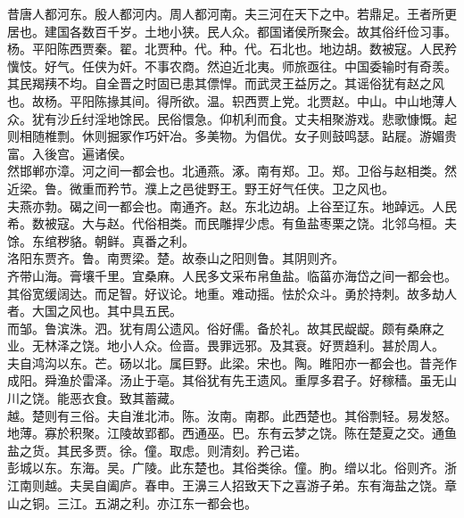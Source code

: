 \documentclass{zhvt-classic}
\begin{document}
\hspace*{2em}昔唐人都河东。殷人都河内。周人都河南。夫三河在天下之中。若鼎足。王者所更居也。建国各数百千岁。土地小狭。民人众。都国诸侯所聚会。故其俗纤俭习事。杨。平阳陈西贾秦。翟。北贾种。代。种。代。石北也。地边胡。数被寇。人民矜懻忮。好气。任侠为奸。不事农商。然迫近北夷。师旅亟往。中国委输时有奇羡。其民羯羠不均。自全晋之时固已患其僄悍。而武灵王益厉之。其谣俗犹有赵之风也。故杨。平阳陈掾其间。得所欲。温。轵西贾上党。北贾赵。中山。中山地薄人众。犹有沙丘纣淫地馀民。民俗懁急。仰机利而食。丈夫相聚游戏。悲歌慷慨。起则相随椎剽。休则掘冢作巧奸冶。多美物。为倡优。女子则鼓鸣瑟。跕屣。游媚贵富。入後宫。遍诸侯。\\
\hspace*{2em}然邯郸亦漳。河之间一都会也。北通燕。涿。南有郑。卫。郑。卫俗与赵相类。然近梁。鲁。微重而矜节。濮上之邑徙野王。野王好气任侠。卫之风也。\\
\hspace*{2em}夫燕亦勃。碣之间一都会也。南通齐。赵。东北边胡。上谷至辽东。地踔远。人民希。数被寇。大与赵。代俗相类。而民雕捍少虑。有鱼盐枣栗之饶。北邻乌桓。夫馀。东绾秽貉。朝鲜。真番之利。\\
\hspace*{2em}洛阳东贾齐。鲁。南贾梁。楚。故泰山之阳则鲁。其阴则齐。\\
\hspace*{2em}齐带山海。膏壤千里。宜桑麻。人民多文采布帛鱼盐。临菑亦海岱之间一都会也。其俗宽缓阔达。而足智。好议论。地重。难动摇。怯於众斗。勇於持刺。故多劫人者。大国之风也。其中具五民。\\
\hspace*{2em}而邹。鲁滨洙。泗。犹有周公遗风。俗好儒。备於礼。故其民龊龊。颇有桑麻之业。无林泽之饶。地小人众。俭啬。畏罪远邪。及其衰。好贾趋利。甚於周人。\\
\hspace*{2em}夫自鸿沟以东。芒。砀以北。属巨野。此梁。宋也。陶。睢阳亦一都会也。昔尧作成阳。舜渔於雷泽。汤止于亳。其俗犹有先王遗风。重厚多君子。好稼穑。虽无山川之饶。能恶衣食。致其蓄藏。\\
\hspace*{2em}越。楚则有三俗。夫自淮北沛。陈。汝南。南郡。此西楚也。其俗剽轻。易发怒。地薄。寡於积聚。江陵故郢都。西通巫。巴。东有云梦之饶。陈在楚夏之交。通鱼盐之货。其民多贾。徐。僮。取虑。则清刻。矜己诺。\\
\hspace*{2em}彭城以东。东海。吴。广陵。此东楚也。其俗类徐。僮。朐。缯以北。俗则齐。浙江南则越。夫吴自阖庐。春申。王濞三人招致天下之喜游子弟。东有海盐之饶。章山之铜。三江。五湖之利。亦江东一都会也。\\
\end{document}
